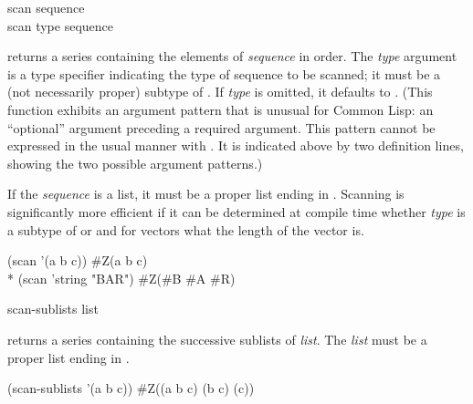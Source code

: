 \begin{defun}[Function]
scan sequence \\
scan type sequence

 returns a series containing the elements of \emph{sequence} in
order.  The \emph{type} argument is a type specifier indicating the type of
sequence to be scanned; it must be a (not necessarily proper) subtype of
.  If \emph{type} is omitted, it defaults to .
(This function exhibits an argument pattern that is unusual for Common
Lisp:  an ``optional'' argument preceding a required argument.  This
pattern cannot be expressed in the usual manner with .  It
is indicated above by two definition lines, showing the two possible
argument patterns.)

If the \emph{sequence} is a list, it must be a proper list ending in .
Scanning is significantly more efficient if it can be determined at compile
time whether \emph{type} is a subtype of  or  and for
vectors what the length of the vector is.
\begin{lisp}
(scan '(a b c)) {\EV} \#Z(a b c) \\*
(scan 'string "BAR") {\EV} \#Z(\#{\Xbackslash}B \#{\Xbackslash}A \#{\Xbackslash}R)
\end{lisp}
\end{defun}

\begin{defun}[Function]
scan-sublists list

 returns a series containing the successive sublists of
\emph{list}.  The \emph{list} must be a proper list ending in .
\begin{lisp}
(scan-sublists '(a b c)) {\EV} \#Z((a b c) (b c) (c))
\end{lisp}
\end{defun}

